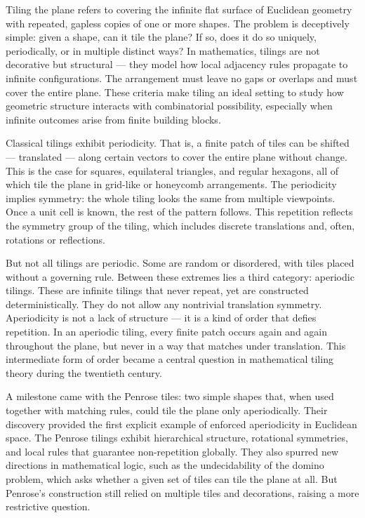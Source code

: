 Tiling the plane refers to covering the infinite flat surface of Euclidean geometry with repeated, gapless copies of one or more shapes. The problem is deceptively simple: given a shape, can it tile the plane? If so, does it do so uniquely, periodically, or in multiple distinct ways? In mathematics, tilings are not decorative but structural — they model how local adjacency rules propagate to infinite configurations. The arrangement must leave no gaps or overlaps and must cover the entire plane. These criteria make tiling an ideal setting to study how geometric structure interacts with combinatorial possibility, especially when infinite outcomes arise from finite building blocks.

Classical tilings exhibit periodicity. That is, a finite patch of tiles can be shifted — translated — along certain vectors to cover the entire plane without change. This is the case for squares, equilateral triangles, and regular hexagons, all of which tile the plane in grid-like or honeycomb arrangements. The periodicity implies symmetry: the whole tiling looks the same from multiple viewpoints. Once a unit cell is known, the rest of the pattern follows. This repetition reflects the symmetry group of the tiling, which includes discrete translations and, often, rotations or reflections.

But not all tilings are periodic. Some are random or disordered, with tiles placed without a governing rule. Between these extremes lies a third category: aperiodic tilings. These are infinite tilings that never repeat, yet are constructed deterministically. They do not allow any nontrivial translation symmetry. Aperiodicity is not a lack of structure — it is a kind of order that defies repetition. In an aperiodic tiling, every finite patch occurs again and again throughout the plane, but never in a way that matches under translation. This intermediate form of order became a central question in mathematical tiling theory during the twentieth century.

A milestone came with the Penrose tiles: two simple shapes that, when used together with matching rules, could tile the plane only aperiodically. Their discovery provided the first explicit example of enforced aperiodicity in Euclidean space. The Penrose tilings exhibit hierarchical structure, rotational symmetries, and local rules that guarantee non-repetition globally. They also spurred new directions in mathematical logic, such as the undecidability of the domino problem, which asks whether a given set of tiles can tile the plane at all. But Penrose’s construction still relied on multiple tiles and decorations, raising a more restrictive question.

